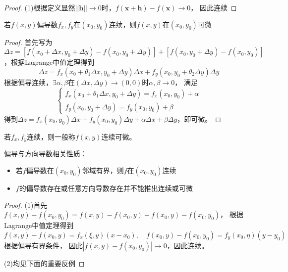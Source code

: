 \begin{proof}
  (1)根据定义显然$||\mathbf{h}|| \rightarrow 0$时，$f(\mathbf{x} + \mathbf{h}) - f(\mathbf{x}) \rightarrow 0$，
  因此连续
\end{proof}

\begin{theorem}[可微充分条件]
  若$f(x,y)$偏导数$f_x,f_y$在$(x_0,y_0)$连续，则$f(x,y)$在$(x_0,y_0)$可微
\end{theorem}

\begin{proof}
  首先写为$\Delta z = [f(x_0+\Delta x, y_0 + \Delta y) - f(x_0 , y_0 + \Delta y)] + [f(x_0,y_0 + \Delta y) - f(x_0,y_0)]$，根据Lagrange中值定理得到
  \begin{equation*}
    \Delta z = f_x(x_0+\theta_1 \Delta x, y_0 + \Delta y)\Delta x + f_y(x_0, y_0 + \theta_2 \Delta y) \Delta y
  \end{equation*}
  根据偏导连续，$\exists \alpha, \beta$在$(\Delta x, \Delta y) \rightarrow (0,0)$时$\alpha, \beta \rightarrow 0$，
  满足
  \begin{equation*}
    \begin{cases}
      f_x(x_0 + \theta_1 \Delta x, y_0 + \Delta y) = f_x(x_0,y_0) + \alpha\\
      f_y(x_0,y_0 + \Delta y) = f_y(x_0,y_0) + \beta
    \end{cases}
  \end{equation*}
  得到$\Delta z = f_x(x_0,y_0) \Delta x + f_y(x_0,y_0)\Delta y + \alpha \Delta x + \beta \Delta y$，即可微。
\end{proof}

\begin{note}
  若$f_x,f_y$连续，则一般称$f(x,y)$连续可微。
\end{note}

\begin{theorem}[偏导与方向导的性质]
  偏导与方向导数相关性质：
  \begin{itemize}
  \item 若$f$偏导数在$(x_0,y_0)$邻域有界，则$f$在$(x_0,y_0)$连续
  \item $f$的偏导数存在或任意方向导数存在并不能推出连续或可微
  \end{itemize}
\end{theorem}

\begin{proof}
  (1)首先$f(x,y) - f(x_0,y_0) = f(x,y) - f(x_0,y) + f(x_0,y) - f(x_0,y_0)$，
  根据Lagrange中值定理得到
  \begin{equation*}
    f(x,y) - f(x_0,y) = f_x(\xi,y)(x-x_0), \quad f(x_0,y) - f(x_0,y_0) = f_y(x_0,\eta)(y-y_0)
  \end{equation*}
  根据偏导有界条件，
  因此$|f(x,y) - f(x_0,y_0)| \rightarrow 0$，因此连续。

  (2)均见下面的重要反例
\end{proof}

